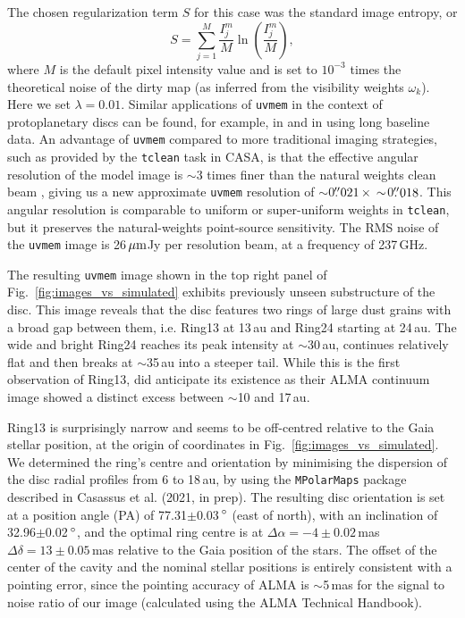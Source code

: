 \documentclass[fleqn,usenatbib,useAMS]{mnras}
\begin{document}
The chosen regularization term $S$ for this case was the standard image entropy, or
\begin{equation}
S = \sum_{j=1}^M \frac{I_j^m}{M} \ln\left(\frac{I_j^m}{M}\right),
\end{equation}
where $M$ is the default pixel intensity value and is set to $10^{-3}$ times the theoretical noise of the dirty map (as inferred from the visibility weights $\omega_k$). Here we set $\lambda = 0.01$. Similar applications of {\tt uvmem} in the context of protoplanetary discs can be found, for example, in \citet{Casassus2013Natur, 2018MNRAS.477.5104C, Casassus2019MNRAS.483.3278C, Perez2019AJ....158...15P} and in \citet{2020ApJ...889L..24P} using long baseline data. An advantage of {\tt uvmem} compared to more traditional imaging strategies, such as provided by the {\tt tclean} task in CASA, is that the effective angular resolution of the model image is $\sim$3 times finer than the natural weights clean beam \citep[][]{2018A&C....22...16C}, giving us a new approximate {\tt uvmem} resolution of $\sim$0$\hbox{$.\!\!^{\prime\prime}$}021 \,\times \,\sim$0$\hbox{$.\!\!^{\prime\prime}$}018$. This angular resolution is comparable to uniform or super-uniform weights in {\tt tclean}, but it preserves the natural-weights point-source sensitivity. The RMS noise of the {\tt uvmem} image is 26\,$\hbox{$\mu$m}$Jy per resolution beam, at a frequency of 237\,GHz.

The resulting {\tt uvmem} image shown in the top right panel of Fig.~\ref{fig:images_vs_simulated} exhibits previously unseen substructure of the disc. This image reveals that the disc features two rings of large dust grains with a broad gap between them, i.e. Ring13 at 13\,au and Ring24 starting at 24\,au. The wide and bright Ring24 reaches its peak intensity at $\sim$30\,au, continues relatively flat and then breaks at $\sim$35\,au into a steeper tail. While this is the first observation of Ring13, \citet{Ru_z_Rodr_guez_2019} did anticipate its existence as their ALMA continuum image showed a distinct excess between $\sim$10 and 17\,au.

Ring13 is surprisingly narrow and seems to be off-centred relative to the Gaia stellar position, at the origin of coordinates in Fig.~\ref{fig:images_vs_simulated}. We determined the ring's centre and orientation by minimising the dispersion of the disc radial profiles from 6 to 18\,au, by using the {\tt MPolarMaps} package described in Casassus et al. (2021, in prep). The resulting disc orientation is set at a position angle (PA) of 77.31$\pm$0.03\,$\hbox{$^\circ$}$ (east of north), with an inclination of 32.96$\pm$0.02\,$\hbox{$^\circ$}$, and the optimal ring centre is at $\Delta \alpha = -4\pm0.02$\,mas $\Delta \delta = 13\pm0.05$\,mas relative to the Gaia position of the stars. The offset of the center of the cavity and the nominal stellar positions is entirely consistent with a pointing error, since the pointing accuracy of ALMA is $\sim$5\,mas for the signal to noise ratio of our image (calculated using the ALMA Technical Handbook).
\end{document}
